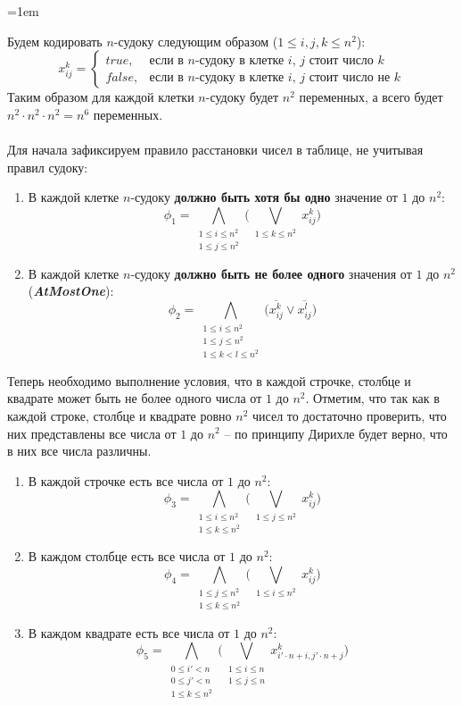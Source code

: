 \documentclass[12pt]{extreport}
\theoremstyle{definiton}
\theoremstyle{definition}
\theoremstyle{definition}
\let\leq\leqslant
\newcommand{\solution}[2][\color{myblue}Решение]{
\medskip
	\noindent{\bfseries #1 }{{\color{myblue}\bfseries #2:}}
}
\newenvironment{blockquote}{%
  \par%
  \medskip
  \leftskip=1em%
  \noindent}{%
  \par\medskip}
\begin{document}
\solution{4}
\begin{blockquote}
{\color{myblue}
\noindent Будем кодировать $n$-судоку следующим образом ($1 \leq i, j, k \leq n^2$):
\begin{equation*}
x_{ij}^k = 
 \begin{cases}
   true, &\text{если в $n$-судоку в клетке $i$, $j$ стоит число $k$}\\
   false, &\text{если в $n$-судоку в клетке $i$, $j$ стоит число не $k$}
 \end{cases}
\end{equation*}
Таким образом для каждой клетки $n$-судоку будет $n^2$ переменных, а всего будет\\ $n^2 \cdot n^2 \cdot n^2 = n^6$ переменных.\\
\\
Для начала зафиксируем правило расстановки чисел в таблице, не учитывая правил судоку:
\begin{enumerate}
    \item В каждой клетке $n$-судоку \textbf{должно быть хотя бы одно} значение от $1$ до $n^2$:
    $$\phi_1 = \bigwedge\limits_{\substack{1 \leq i \leq n^2\\1 \leq j \leq n^2}}\Big(\bigvee\limits_{\substack{1 \leq k \leq n^2}}x_{ij}^k\Big)$$
    \item В каждой клетке $n$-судоку \textbf{должно быть не более одного} значения от $1$ до $n^2$ (\textbf{\textit{AtMostOne}}):
    $$\phi_2 = \bigwedge\limits_{\substack{1 \leq i \leq n^2\\1 \leq j \leq n^2\\1 \leq k < l \leq n^2}}\Big(\overline{x_{ij}^k} \vee \overline{x_{ij}^l}\Big)$$
\end{enumerate}
Теперь необходимо выполнение условия, что в каждой строчке, столбце и квадрате может быть не более одного числа от $1$ до $n^2$. Отметим, что так как в каждой строке, столбце и квадрате ровно $n^2$ чисел то достаточно проверить, что них представлены все числа от $1$ до $n^2$ -- по принципу Дирихле будет верно, что в них все числа различны.
\begin{enumerate}
    \item В каждой строчке есть все числа от $1$ до $n^2$:
    $$\phi_3 = \bigwedge\limits_{\substack{1 \leq i \leq n^2\\1 \leq k \leq n^2}}\Big(\bigvee\limits_{\substack{1 \leq j \leq n^2}}x_{ij}^k\Big)$$
    \item В каждом столбце есть все числа от $1$ до $n^2$:
    $$\phi_4 = \bigwedge\limits_{\substack{1 \leq j \leq n^2\\1 \leq k \leq n^2}}\Big(\bigvee\limits_{\substack{1 \leq i \leq n^2}}x_{ij}^k\Big)$$
    \item В каждом квадрате есть все числа от $1$ до $n^2$:
    $$\phi_5 = \bigwedge\limits_{\substack{0 \leq i' < n\\0 \leq j' < n\\ 1 \leq k \leq n^2}}\Big(\bigvee\limits_{\substack{1 \leq i \leq n\\1 \leq j \leq n}}x_{i' \cdot n + i, j' \cdot n + j}^k\Big)$$
\end{enumerate}

}
\end{blockquote}
\end{document}
